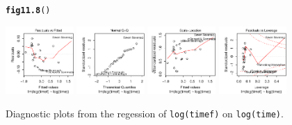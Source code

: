 \documentclass[12pt, a4paper,  BCOR=8.25mm, DIV=15]{scrartcl}\usepackage[]{graphicx}\usepackage[]{color}
\makeatletter
\newcommand{\hlstd}[1]{\textcolor[rgb]{0.345,0.345,0.345}{#1}}%
\newcommand{\hlkwd}[1]{\textcolor[rgb]{0.737,0.353,0.396}{\textbf{#1}}}%
\newenvironment{kframe}{%
 \def\at@end@of@kframe{}%
 \ifinner\ifhmode%
  \def\at@end@of@kframe{\end{minipage}}%
  \begin{minipage}{\columnwidth}%
 \fi\fi%
 \def\FrameCommand##1{\hskip\@totalleftmargin \hskip-\fboxsep
 \colorbox{shadecolor}{##1}\hskip-\fboxsep
     \hskip-\linewidth \hskip-\@totalleftmargin \hskip\columnwidth}%
 \MakeFramed {\advance\hsize-\width
   \@totalleftmargin\z@ \linewidth\hsize
   \@setminipage}}%
 {\par\unskip\endMakeFramed%
 \at@end@of@kframe}
\newenvironment{knitrout}{}{} %
\newcommand{\txtt}[1]{{\texttt{#1}}}
\makeatother
\begin{document}
\begin{figure}[H]
\begin{knitrout}
\color{fgcolor}\begin{kframe}
\begin{alltt}
\hlkwd{fig11.8}\hlstd{()}
\end{alltt}
\end{kframe}

{\centering \includegraphics[width=0.23\textwidth]{figs/reg-diag-logmf-11_8-1} 
\includegraphics[width=0.23\textwidth]{figs/reg-diag-logmf-11_8-2} 
\includegraphics[width=0.23\textwidth]{figs/reg-diag-logmf-11_8-3} 
\includegraphics[width=0.23\textwidth]{figs/reg-diag-logmf-11_8-4} 

}



\end{knitrout}
\caption{Diagnostic plots from the regession of \txtt{log(timef)} on
  \txtt{log(time)}.}\label{fig:diag-mftime-log}
\end{figure}
\end{document}
